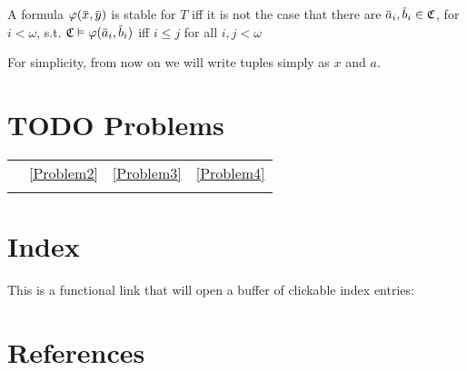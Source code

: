 \documentclass[11pt]{article}
\begin{document}
\begin{remark}
A formula \(\varphi(\barx,\bary)\) is stable for \(T\) iff it is not the case that there
are \(\bara_i,\barb_i\in\fC\), for \(i<\omega\), s.t. \(\fC\vDash\varphi(\bara_i,\barb_i)\) iff \(i\le j\) for all \(i,j<\omega\)
\end{remark}

For simplicity, from now on we will write tuples simply as \(x\) and \(a\).


\section{{\bfseries\sffamily TODO} Problems}
\label{sec:org1d66d54}
\begin{center}
\begin{tabular}{llll}
 & \ref{Problem2} & \ref{Problem3} & \ref{Problem4}\\
 &  & \\
\end{tabular}
\end{center}

\section{Index}
\label{sec:orgf8bd7fb}

This is a functional link that will open a buffer of clickable index entries:

\renewcommand{\indexname}{}
\printindex

\section{References}
\label{sec:org93d5bc9}

\label{bibliographystyle link}


\label{bibliography link}

\end{document}
